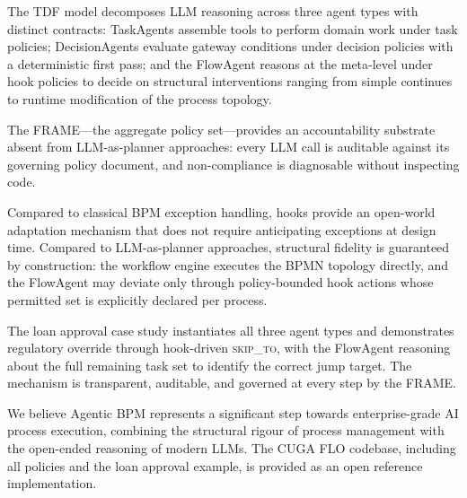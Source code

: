 \documentclass[11pt,a4paper]{article}
\begin{document}
The TDF model decomposes LLM reasoning across three agent types with distinct
contracts: TaskAgents assemble tools to perform domain work under task policies;
DecisionAgents evaluate gateway conditions under decision policies with a
deterministic first pass; and the FlowAgent reasons at the meta-level under hook
policies to decide on structural interventions ranging from simple continues to
runtime modification of the process topology.

The FRAME---the aggregate policy set---provides an accountability substrate absent
from LLM-as-planner approaches: every LLM call is auditable against its governing
policy document, and non-compliance is diagnosable without inspecting code.

Compared to classical BPM exception handling, hooks provide an open-world
adaptation mechanism that does not require anticipating exceptions at design time.
Compared to LLM-as-planner approaches, structural fidelity is guaranteed by
construction: the workflow engine executes the BPMN topology directly, and the
FlowAgent may deviate only through policy-bounded hook actions whose permitted set
is explicitly declared per process.

The loan approval case study instantiates all three agent types and demonstrates
regulatory override through hook-driven \textsc{skip\_to}, with the FlowAgent
reasoning about the full remaining task set to identify the correct jump target.
The mechanism is transparent, auditable, and governed at every step by the FRAME.

We believe Agentic BPM represents a significant step towards enterprise-grade
AI process execution, combining the structural rigour of process management with
the open-ended reasoning of modern LLMs. The CUGA FLO codebase, including all
policies and the loan approval example, is provided as an open reference
implementation.
\end{document}

